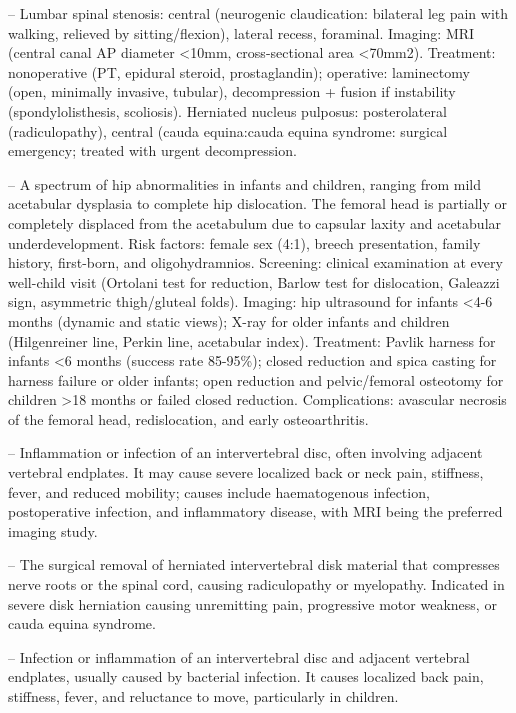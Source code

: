 -- Lumbar spinal stenosis: central (neurogenic claudication: bilateral leg pain with walking, relieved by sitting/flexion), lateral recess, foraminal. Imaging: MRI (central canal AP diameter <10mm, cross-sectional area <70mm2). Treatment: nonoperative (PT, epidural steroid, prostaglandin); operative: laminectomy (open, minimally invasive, tubular), decompression + fusion if instability (spondylolisthesis, scoliosis). Herniated nucleus pulposus: posterolateral (radiculopathy), central (cauda equina:cauda equina syndrome: surgical emergency; treated with urgent decompression.

-- A spectrum of hip abnormalities in infants and children, ranging from mild acetabular dysplasia to complete hip dislocation. The femoral head is partially or completely displaced from the acetabulum due to capsular laxity and acetabular underdevelopment. Risk factors: female sex (4:1), breech presentation, family history, first-born, and oligohydramnios. Screening: clinical examination at every well-child visit (Ortolani test for reduction, Barlow test for dislocation, Galeazzi sign, asymmetric thigh/gluteal folds). Imaging: hip ultrasound for infants <4-6 months (dynamic and static views); X-ray for older infants and children (Hilgenreiner line, Perkin line, acetabular index). Treatment: Pavlik harness for infants <6 months (success rate 85-95\%); closed reduction and spica casting for harness failure or older infants; open reduction and pelvic/femoral osteotomy for children >18 months or failed closed reduction. Complications: avascular necrosis of the femoral head, redislocation, and early osteoarthritis.

-- Inflammation or infection of an intervertebral disc, often involving adjacent vertebral endplates. It may cause severe localized back or neck pain, stiffness, fever, and reduced mobility; causes include haematogenous infection, postoperative infection, and inflammatory disease, with MRI being the preferred imaging study.

-- The surgical removal of herniated intervertebral disk material that compresses nerve roots or the spinal cord, causing radiculopathy or myelopathy. Indicated in severe disk herniation causing unremitting pain, progressive motor weakness, or cauda equina syndrome.

-- Infection or inflammation of an intervertebral disc and adjacent vertebral endplates, usually caused by bacterial infection. It causes localized back pain, stiffness, fever, and reluctance to move, particularly in children.


